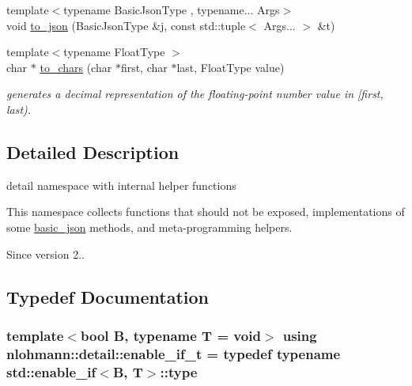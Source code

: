 \begin{DoxyCompactItemize}
\item 
{\footnotesize template$<$typename Basic\+Json\+Type , typename... Args$>$ }\\void \hyperlink{namespacenlohmann_1_1detail_aa7a47b08eee864c2c108c04954919648}{to\+\_\+json} (Basic\+Json\+Type \&j, const std\+::tuple$<$ Args... $>$ \&t)
\item 
{\footnotesize template$<$typename Float\+Type $>$ }\\char $\ast$ \hyperlink{namespacenlohmann_1_1detail_a6192f1eab05fbbc5c35edb8368c8fc57}{to\+\_\+chars} (char $\ast$first, char $\ast$last, Float\+Type value)
\begin{DoxyCompactList}\small\item\em generates a decimal representation of the floating-\/point number value in \mbox{[}first, last). \end{DoxyCompactList}\end{DoxyCompactItemize}


\subsection{Detailed Description}
detail namespace with internal helper functions 

This namespace collects functions that should not be exposed, implementations of some \hyperlink{classnlohmann_1_1basic__json}{basic\+\_\+json} methods, and meta-\/programming helpers.

\begin{DoxySince}{Since}
version 2.. 
\end{DoxySince}


\subsection{Typedef Documentation}
\subsubsection[{\texorpdfstring{enable\+\_\+if\+\_\+t}{enable_if_t}}]{\setlength{\rightskip}{0pt plus 5cm}template$<$bool B, typename T  = void$>$ using {\bf nlohmann\+::detail\+::enable\+\_\+if\+\_\+t} = typedef typename std\+::enable\+\_\+if$<$B, T$>$\+::type}\hypertarget{namespacenlohmann_1_1detail_a02bcbc878bee413f25b985ada771aa9c}{}\label{namespacenlohmann_1_1detail_a02bcbc878bee413f25b985ada771aa9c}


